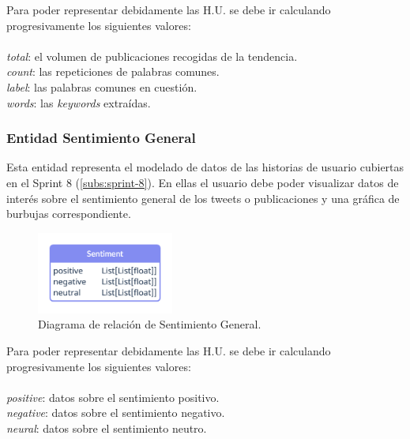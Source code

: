 Para poder representar debidamente las H.U. se debe ir calculando progresivamente los siguientes valores:
\\\\
\textit{total}: el volumen de publicaciones recogidas de la tendencia.  \\
\textit{count}: las repeticiones de palabras comunes.    \\
\textit{label}: las palabras comunes en cuestión.    \\
\textit{words}: las \textit{keywords} extraídas.

\subsubsection{Entidad Sentimiento General}\label{subsub:ent-sentiment}
Esta entidad representa el modelado de datos de las historias de usuario cubiertas en el Sprint 8 (\ref{subs:sprint-8}). En ellas el usuario debe poder visualizar datos de interés sobre el sentimiento general de los tweets o publicaciones y una gráfica de burbujas correspondiente.
\begin{figure}[H]
    \centering
    \myfloatalign
    \includegraphics[width=0.4\textwidth]{gfx/diagrama-er3.png}
    \caption[Diagrama de relación de Sentimiento General]{Diagrama de relación de Sentimiento General.}\label{gfx:diagrama-er3}
\end{figure}

Para poder representar debidamente las H.U. se debe ir calculando progresivamente los siguientes valores:
\\\\
\textit{positive}: datos sobre el sentimiento positivo.  \\
\textit{negative}: datos sobre el sentimiento negativo.    \\
\textit{neural}: datos sobre el sentimiento neutro.

